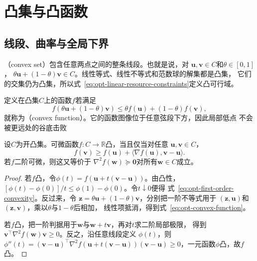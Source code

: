 \section{凸集与凸函数}
\label{sec:opt-convexity}

\subsection{线段、曲率与全局下界}

（convex set）包含任意两点之间的整条线段。也就是说，对
$\bm{u},\bm{v}\in C$和$\theta\in[0,1]$，
$\theta\bm{u}+(1-\theta)\bm{v}\in C$。线性等式、线性不等式和范数球的解集都是凸集，
它们的交集仍为凸集，所以式~\eqref{eq:opt-linear-resource-constraints}定义凸可行域。

定义在凸集$C$上的函数$f$若满足
\begin{equation}
  f(\theta\bm{u}+(1-\theta)\bm{v})
  \leq
  \theta f(\bm{u})+(1-\theta)f(\bm{v}),
  \label{eq:opt-convex-function}
\end{equation}
就称为（convex function）。它的函数图像位于任意弦段下方，因此局部低点
不会被更远处的谷底击败

\begin{theorem}[凸函数的一阶与二阶判据]
\label{thm:opt-convexity-criteria}
设$C$为开凸集。可微函数$f:C\to\mathbb{R}$凸，当且仅当对任意
$\bm{u},\bm{v}\in C$，
\begin{equation}
  f(\bm{v})\geq f(\bm{u})
  +\langle\nabla f(\bm{u}),\bm{v}-\bm{u}\rangle.
  \label{eq:opt-first-order-convexity}
\end{equation}
若$f$二阶可微，则这又等价于
$\nabla^2f(\bm{w})\succeq\bm{0}$对所有$\bm{w}\in C$成立。
\end{theorem}

\begin{proof}
若$f$凸，令$\phi(t)=f(\bm{u}+t(\bm{v}-\bm{u}))$。由凸性，
$[\phi(t)-\phi(0)]/t\leq\phi(1)-\phi(0)$。令$t\downarrow0$便得
式~\eqref{eq:opt-first-order-convexity}。反过来，令
$\bm{z}=\theta\bm{u}+(1-\theta)\bm{v}$，分别把一阶不等式用于
$(\bm{z},\bm{u})$和$(\bm{z},\bm{v})$，乘以$\theta$与$1-\theta$后相加，
线性项抵消，得到式~\eqref{eq:opt-convex-function}。

若$f$凸，把一阶判据用于$\bm{w}$与$\bm{w}+t\bm{v}$，再对$t$求二阶局部极限，
得到$\bm{v}^{\top}\nabla^2f(\bm{w})\bm{v}\geq0$。反之，沿任意线段定义
$\phi(t)$，则
$\phi''(t)=(\bm{v}-\bm{u})^{\top}\nabla^2f(\bm{u}+t(\bm{v}-\bm{u}))
(\bm{v}-\bm{u})\geq0$，一元函数$\phi$凸，故$f$凸。
\end{proof}

